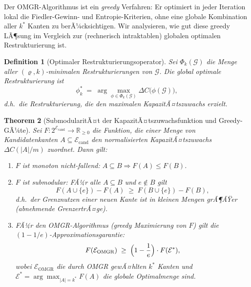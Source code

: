 ﻿\documentclass[12pt, a4paper, openany]{report}
\newtheorem{theorem}{Theorem}[chapter]
\newtheorem{definition}[theorem]{Definition}
\newcommand{\R}{\mathbb{R}}
\newcommand{\calG}{\mathcal{G}}
\newcommand{\calE}{\mathcal{E}}
\begin{document}
Der OMGR-Algorithmus ist ein \emph{greedy} Verfahren: Er optimiert in
jeder Iteration lokal die Fiedler-Gewinn- und Entropie-Kriterien,
ohne eine globale Kombination aller $k^*$ Kanten zu berÃ¼cksichtigen.
Wir analysieren, wie gut diese greedy LÃ¶sung im Vergleich zur
(rechnerisch intraktablen) globalen optimalen Restrukturierung ist.

\begin{definition}[Optimaler Restrukturierungsoperator]
\label{def:optimal_restr}
Sei $\Phi_k(\calG)$ die Menge aller $(\varrho, k)$-minimalen
Restrukturierungen von $\calG$.  Die \emph{global optimale Restrukturierung}
ist
\[
  \phi^*_k \;=\; \arg\max_{\phi \in \Phi_k(\calG)} \Delta C\!\bigl(\phi(\calG)\bigr),
\]
d.h.\ die Restrukturierung, die den maximalen KapazitÃ¤tszuwachs erzielt.
\end{definition}

\begin{theorem}[SubmodularitÃ¤t der KapazitÃ¤tszuwachsfunktion und Greedy-GÃ¼te]
\label{thm:submodularity}
Sei $F : 2^{\calE_{\mathrm{cand}}} \to \R_{\geq 0}$ die Funktion, die
einer Menge von Kandidatenkanten $A \subseteq \calE_{\mathrm{cand}}$ den
normalisierten KapazitÃ¤tszuwachs $\Delta C(|A|/m)$ zuordnet.  Dann gilt:
\begin{enumerate}[label=(\roman*)]
  \item $F$ ist \emph{monoton nicht-fallend}:
    $A \subseteq B \Rightarrow F(A) \leq F(B)$.
  \item $F$ ist \emph{submodular}: FÃ¼r alle $A \subseteq B$ und
    $e \notin B$ gilt
    \begin{equation}
      \label{eq:submodular}
      F(A \cup \{e\}) - F(A)
      \;\geq\;
      F(B \cup \{e\}) - F(B),
    \end{equation}
    d.h.\ der Grenznutzen einer neuen Kante ist in kleinen Mengen
    grÃ¶ÃŸer (abnehmende GrenzertrÃ¤ge).
  \item FÃ¼r den OMGR-Algorithmus (greedy Maximierung von $F$) gilt
    die \emph{$(1-1/e)$-Approxi\-mationsgarantie}:
    \begin{equation}
      \label{eq:greedy_approx}
      F(\calE_{\mathrm{OMGR}}) \;\geq\; \Bigl(1 - \frac{1}{e}\Bigr) \cdot F(\calE^*),
    \end{equation}
    wobei $\calE_{\mathrm{OMGR}}$ die durch OMGR gewÃ¤hlten $k^*$ Kanten
    und $\calE^* = \arg\max_{|A|=k^*} F(A)$ die globale Optimalmenge sind.
\end{enumerate}
\end{theorem}
\end{document}

